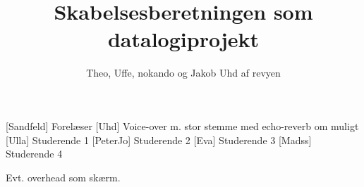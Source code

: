 \documentclass[danish]{article}
\title{Skabelsesberetningen som datalogiprojekt}
\author{Theo, Uffe, nokando og Jakob Uhd af revyen}
\begin{document}
\maketitle

\begin{roles}
  
  [Sandfeld] Forelæser   
  [Uhd] Voice-over m. stor stemme med echo-reverb om muligt
  [Ulla] Studerende 1
  [PeterJo] Studerende 2
  [Eva] Studerende 3
  [Madss] Studerende 4
  
\end{roles}

\begin{props}


  
   Evt. overhead som skærm. 


\end{props}
\end{document}
